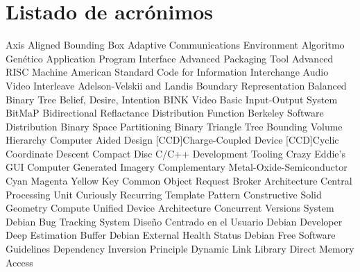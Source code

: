 

\chapterauthors{}
\chapter*{Listado de acrónimos}
\label{chap:acronimos}

{\small
\begin{acronym}[XXXXXXXX]
   {Axis Aligned Bounding Box}
    {Adaptive Communications Environment}
     {Algoritmo Genético}
    {Application Program Interface}
    {Advanced Packaging Tool}
    {Advanced RISC Machine} 
  {American Standard Code for Information Interchange}
    {Audio Video Interleave}
    {Adelson-Velskii and Landis}
  {Boundary Representation}
    {Balanced Binary Tree}
    {Belief, Desire, Intention}
    {BINK Video}
   {Basic Input-Output System}
    {BitMaP}
   {Bidirectional Reflactance Distribution Function}
    {Berkeley Software Distribution} 
    {Binary Space Partitioning}
    {Binary Triangle Tree}
    {Bounding Volume Hierarchy}
    {Computer Aided Design}
  [CCD]{Charge-Coupled Device}
    [CCD]{Cyclic Coordinate Descent}
     {Compact Disc}
    {C/C++ Development Tooling}
  {Crazy Eddie's GUI}
    {Computer Generated Imagery}
   {Complementary Metal-Oxide-Semiconductor}
   {Cyan Magenta Yellow Key}
  {Common Object Request Broker Architecture}
    {Central Processing Unit}
   {Curiously Recurring Template Pattern}
    {Constructive Solid Geometry}
   {Compute Unified Device Architecture}
    {Concurrent Versions System}
   {Debian Bug Tracking System}
    {Diseño Centrado en el Usuario}
     {Debian Developer}
    {Deep Estimation Buffer}
   {Debian External Health Status}
   {Debian Free Software Guidelines}
    {Dependency Inversion Principle}
    {Dynamic Link Library}
    {Direct Memory Access}

\end{acronym}}

